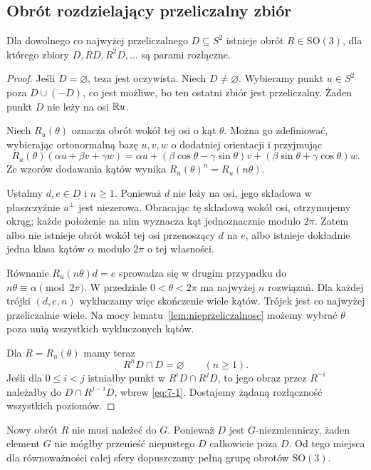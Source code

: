 \subsection{Obrót rozdzielający przeliczalny zbiór}
\begin{lemat}\label{lem:obrot-rozdzielajacy}
Dla dowolnego co najwyżej przeliczalnego $D\subseteq S^2$ istnieje obrót $R\in\mathrm{SO}(3)$, dla którego zbiory $D,RD,R^2D,\ldots$ są parami rozłączne.
\end{lemat}
\begin{proof}
Jeśli $D=\varnothing$, teza jest oczywista. Niech $D\ne\varnothing$. Wybieramy punkt $u\in S^2$ poza $D\cup(-D)$, co jest możliwe, bo ten ostatni zbiór jest przeliczalny. Żaden punkt $D$ nie leży na osi $\mathbb R u$.

Niech $R_u(\theta)$ oznacza obrót wokół tej osi o kąt $\theta$. Można go zdefiniować, wybierając ortonormalną bazę $u,v,w$ o dodatniej orientacji i przyjmując
\[
 R_u(\theta)(\alpha u+\beta v+\gamma w)=\alpha u+
 (\beta\cos\theta-\gamma\sin\theta)v+
 (\beta\sin\theta+\gamma\cos\theta)w.
\]
Ze wzorów dodawania kątów wynika $R_u(\theta)^n=R_u(n\theta)$.

Ustalmy $d,e\in D$ i $n\ge1$. Ponieważ $d$ nie leży na osi, jego składowa w płaszczyźnie $u^\perp$ jest niezerowa. Obracając tę składową wokół osi, otrzymujemy okrąg; każde położenie na nim wyznacza kąt jednoznacznie modulo $2\pi$. Zatem albo nie istnieje obrót wokół tej osi przenoszący $d$ na $e$, albo istnieje dokładnie jedna klasa kątów $\alpha$ modulo $2\pi$ o tej własności.

Równanie $R_u(n\theta)d=e$ sprowadza się w drugim przypadku do $n\theta\equiv\alpha\pmod{2\pi}$. W przedziale $0<\theta<2\pi$ ma najwyżej $n$ rozwiązań. Dla każdej trójki $(d,e,n)$ wykluczamy więc skończenie wiele kątów. Trójek jest co najwyżej przeliczalnie wiele. Na mocy lematu~\ref{lem:nieprzeliczalnosc} możemy wybrać $\theta$ poza unią wszystkich wykluczonych kątów.

Dla $R=R_u(\theta)$ mamy teraz
\begin{equation}\label{eq:7-1}
 R^nD\cap D=\varnothing\qquad(n\ge1).
\end{equation}
Jeśli dla $0\le i<j$ istniałby punkt w $R^iD\cap R^jD$, to jego obraz przez $R^{-i}$ należałby do $D\cap R^{j-i}D$, wbrew \eqref{eq:7-1}. Dostajemy żądaną rozłączność wszystkich poziomów.
\end{proof}
\begin{uwaga}
Nowy obrót $R$ nie musi należeć do $G$. Ponieważ $D$ jest $G$-niezmienniczy, żaden element $G$ nie mógłby przenieść niepustego $D$ całkowicie poza $D$. Od tego miejsca dla równoważności całej sfery dopuszczamy pełną grupę obrotów $\mathrm{SO}(3)$.
\end{uwaga}
